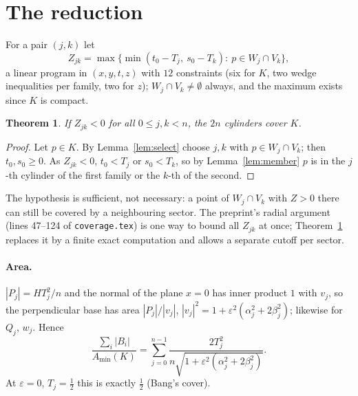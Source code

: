 \documentclass[11pt]{amsart}
\newtheorem{theorem}{Theorem}
\theoremstyle{remark}
\newcommand{\eps}{\varepsilon}
\begin{document}
\section{The reduction}
For a pair $(j,k)$ let
\[
Z_{jk}=\max\{\min(t_0-T_j,\ s_0-T_k):\ p\in W_j\cap V_k\},
\]
a linear program in $(x,y,t,z)$ with $12$ constraints (six for $K$, two wedge inequalities per family,
two for $z$); $W_j\cap V_k\ne\emptyset$ always, and the maximum exists since $K$ is compact.

\begin{theorem}\label{thm:reduction}
If $Z_{jk}<0$ for all $0\le j,k<n$, the $2n$ cylinders cover $K$.
\end{theorem}
\begin{proof}
Let $p\in K$. By Lemma~\ref{lem:select} choose $j,k$ with $p\in W_j\cap V_k$; then $t_0,s_0\ge0$.
As $Z_{jk}<0$, $t_0<T_j$ or $s_0<T_k$, so by Lemma~\ref{lem:member} $p$ is in the $j$-th
cylinder of the first family or the $k$-th of the second.
\end{proof}
The hypothesis is sufficient, not necessary: a point of $W_j\cap V_k$ with $Z>0$ there can still be
covered by a neighbouring sector. The preprint's radial argument (lines 47--124 of
\texttt{coverage.tex}) is one way to bound all $Z_{jk}$ at once; Theorem~\ref{thm:reduction} replaces
it by a finite exact computation and allows a separate cutoff per sector.

\paragraph{Area.} $|P_j|=HT_j^2/n$ and the normal of the plane $x=0$ has inner product $1$ with
$v_j$, so the perpendicular base has area $|P_j|/|v_j|$, $|v_j|^2=1+\eps^2(\alpha_j^2+2\beta_j^2)$;
likewise for $Q_j$, $w_j$. Hence
\begin{equation}\label{eq:area}
\frac{\sum_i|B_i|}{A_{\min}(K)}=\sum_{j=0}^{n-1}\frac{2T_j^2}{n\sqrt{1+\eps^2(\alpha_j^2+2\beta_j^2)}}.
\end{equation}
At $\eps=0$, $T_j=\frac12$ this is exactly $\frac12$ (Bang's cover).
\end{document}
